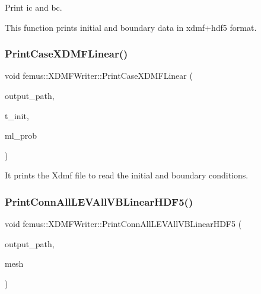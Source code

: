 Print ic and bc. 

This function prints initial and boundary data in xdmf+hdf5 format. \mbox{\label{classfemus_1_1_x_d_m_f_writer_adb7f2e11872687f2ec8d7293e6123afe}} 
\subsubsection{\texorpdfstring{Print\+Case\+X\+D\+M\+F\+Linear()}{PrintCaseXDMFLinear()}}
{\footnotesize\ttfamily void femus\+::\+X\+D\+M\+F\+Writer\+::\+Print\+Case\+X\+D\+M\+F\+Linear (\begin{DoxyParamCaption}\item[{const std\+::string}]{output\+\_\+path,  }\item[{const \mbox{\hyperlink{_typedefs_8hpp_a91ad9478d81a7aaf2593e8d9c3d06a14}{uint}}}]{t\+\_\+init,  }\item[{const \mbox{\hyperlink{classfemus_1_1_multi_level_problem}{Multi\+Level\+Problem}} \&}]{ml\+\_\+prob }\end{DoxyParamCaption})\hspace{0.3cm}{\ttfamily [static]}}



It prints the Xdmf file to read the initial and boundary conditions. 

\mbox{\label{classfemus_1_1_x_d_m_f_writer_a175edd0c10dde447fcf184ac2d03831b}} 
\subsubsection{\texorpdfstring{Print\+Conn\+All\+L\+E\+V\+All\+V\+B\+Linear\+H\+D\+F5()}{PrintConnAllLEVAllVBLinearHDF5()}}
{\footnotesize\ttfamily void femus\+::\+X\+D\+M\+F\+Writer\+::\+Print\+Conn\+All\+L\+E\+V\+All\+V\+B\+Linear\+H\+D\+F5 (\begin{DoxyParamCaption}\item[{const std\+::string}]{output\+\_\+path,  }\item[{const \mbox{\hyperlink{classfemus_1_1_multi_level_mesh_two}{Multi\+Level\+Mesh\+Two}} \&}]{mesh }\end{DoxyParamCaption})\hspace{0.3cm}{\ttfamily [static]}}



